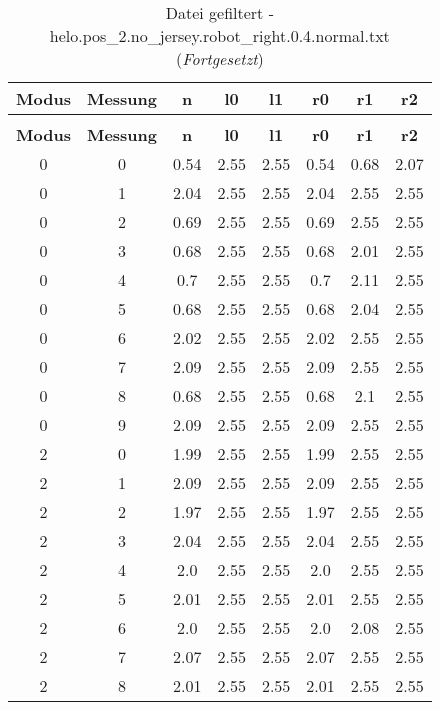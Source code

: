\begin{longtable}{|c|c||c||c|c||c|c|c|}
	\caption{Datei gefiltert - helo.pos\_2.no\_jersey.robot\_right.0.4.normal.txt} \label{tab:helo.pos-2.no-jersey.robot-right.0.4.normal.txt} \\ \hline
	\textbf{Modus} & \textbf{Messung} & \textbf{n} & \textbf{l0} & \textbf{l1} & \textbf{r0} & \textbf{r1} & \textbf{r2}\\ \hline
	\endfirsthead
	\caption[]{Datei gefiltert - helo.pos\_2.no\_jersey.robot\_right.0.4.normal.txt (\emph{Fortgesetzt})} \\ \hline
	\textbf{Modus} & \textbf{Messung} & \textbf{n} & \textbf{l0} & \textbf{l1} & \textbf{r0} & \textbf{r1} & \textbf{r2}\\ \hline
	\endhead
	0 & 0 & 0.54 & 2.55 & 2.55 & 0.54 & 0.68 & 2.07 \\ \hline
	0 & 1 & 2.04 & 2.55 & 2.55 & 2.04 & 2.55 & 2.55 \\ \hline
	0 & 2 & 0.69 & 2.55 & 2.55 & 0.69 & 2.55 & 2.55 \\ \hline
	0 & 3 & 0.68 & 2.55 & 2.55 & 0.68 & 2.01 & 2.55 \\ \hline
	0 & 4 & 0.7 & 2.55 & 2.55 & 0.7 & 2.11 & 2.55 \\ \hline
	0 & 5 & 0.68 & 2.55 & 2.55 & 0.68 & 2.04 & 2.55 \\ \hline
	0 & 6 & 2.02 & 2.55 & 2.55 & 2.02 & 2.55 & 2.55 \\ \hline
	0 & 7 & 2.09 & 2.55 & 2.55 & 2.09 & 2.55 & 2.55 \\ \hline
	0 & 8 & 0.68 & 2.55 & 2.55 & 0.68 & 2.1 & 2.55 \\ \hline
	0 & 9 & 2.09 & 2.55 & 2.55 & 2.09 & 2.55 & 2.55 \\ \hline
	2 & 0 & 1.99 & 2.55 & 2.55 & 1.99 & 2.55 & 2.55 \\ \hline
	2 & 1 & 2.09 & 2.55 & 2.55 & 2.09 & 2.55 & 2.55 \\ \hline
	2 & 2 & 1.97 & 2.55 & 2.55 & 1.97 & 2.55 & 2.55 \\ \hline
	2 & 3 & 2.04 & 2.55 & 2.55 & 2.04 & 2.55 & 2.55 \\ \hline
	2 & 4 & 2.0 & 2.55 & 2.55 & 2.0 & 2.55 & 2.55 \\ \hline
	2 & 5 & 2.01 & 2.55 & 2.55 & 2.01 & 2.55 & 2.55 \\ \hline
	2 & 6 & 2.0 & 2.55 & 2.55 & 2.0 & 2.08 & 2.55 \\ \hline
	2 & 7 & 2.07 & 2.55 & 2.55 & 2.07 & 2.55 & 2.55 \\ \hline
	2 & 8 & 2.01 & 2.55 & 2.55 & 2.01 & 2.55 & 2.55 \\ \hline

\end{longtable}
